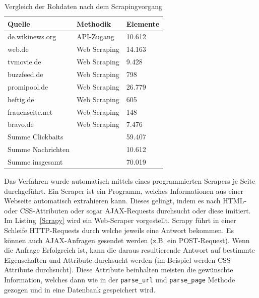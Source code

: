 \begin{table}[h]
    \caption{Vergleich der Rohdaten nach dem Scrapingvorgang}
    \label{Datensatz_Herkunft}
    \renewcommand{\arraystretch}{1.2}
    \centering
    \sffamily
    \begin{footnotesize}
        \begin{tabular}{l l l}
            \toprule
            \textbf{Quelle}   & \textbf{Methodik} & Elemente \\
            \midrule
            de.wikinews.org   & API-Zugang        & 10.612   \\
            web.de            & Web Scraping      & 14.163   \\
            tvmovie.de        & Web Scraping      & 9.428    \\
            buzzfeed.de       & Web Scraping      & 798      \\
            promipool.de      & Web Scraping      & 26.779   \\
            heftig.de         & Web Scraping      & 605      \\
            frauenseite.net   & Web Scraping      & 148      \\
            bravo.de          & Web Scraping      & 7.476    \\
            \midrule
            Summe Clickbaits  &                   & 59.407   \\
            Summe Nachrichten &                   & 10.612   \\
            Summe insgesamt   &                   & 70.019   \\
            \bottomrule
        \end{tabular}
    \end{footnotesize}
    \rmfamily
\end{table}



Das Verfahren wurde automatisch mittels eines programmierten Scrapers je Seite durchgeführt. Ein Scraper ist ein Programm, welches Informationen aus einer Webseite automatisch extrahieren kann. Dieses gelingt, indem es nach HTML- oder CSS-Attributen oder sogar AJAX-Requests durchsucht oder diese imitiert. Im Listing~\ref{Scrapy} wird ein Web-Scraper vorgestellt. Scrapy führt in einer Schleife HTTP-Requests durch welche jeweils eine Antwort bekommen. Es können auch AJAX-Anfragen gesendet werden (z.B. ein POST-Request). Wenn die Anfrage Erfolgreich ist, kann die daraus resultierende Antwort auf bestimmte Eigenschaften und Attribute durchsucht werden (im Beispiel werden CSS-Attribute durchsucht). Diese Attribute beinhalten meisten die gewünschte Information, welches dann wie in der \texttt{parse\_url} und \texttt{parse\_page} Methode gezogen und in eine Datenbank gespeichert wird.



